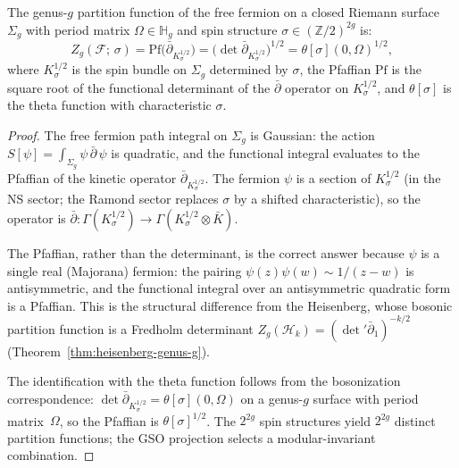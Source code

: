 \begin{theorem}
\label{thm:fermion-sewing}
The genus-$g$ partition function of the free fermion on a closed Riemann
surface $\Sigma_g$ with period matrix $\Omega \in \mathbb{H}_g$ and
spin structure $\sigma \in (\mathbb{Z}/2)^{2g}$ is:
\begin{equation}\label{eq:fermion-partition}
Z_g(\mathcal{F};\, \sigma)
= \mathrm{Pf}\bigl(\bar{\partial}_{K^{1/2}_\sigma}\bigr)
= \bigl(\det \bar{\partial}_{K^{1/2}_\sigma}\bigr)^{1/2}
= \theta[\sigma](0,\Omega)^{1/2},
\end{equation}
where $K^{1/2}_\sigma$ is the spin bundle on $\Sigma_g$ determined by
$\sigma$, the Pfaffian $\mathrm{Pf}$ is the square root of the functional
determinant of the $\bar\partial$ operator on $K^{1/2}_\sigma$, and
$\theta[\sigma]$ is the theta function with characteristic $\sigma$.
\end{theorem}

\begin{proof}
The free fermion path integral on $\Sigma_g$ is Gaussian:
the action $S[\psi] = \int_{\Sigma_g} \psi\, \bar{\partial}\, \psi$
is quadratic, and the functional integral evaluates to the Pfaffian
of the kinetic operator $\bar{\partial}_{K^{1/2}_\sigma}$. The fermion
$\psi$ is a section of $K^{1/2}_\sigma$ (in the NS sector;
the Ramond sector replaces $\sigma$ by a shifted characteristic),
so the operator is $\bar{\partial}: \Gamma(K^{1/2}_\sigma) \to
\Gamma(K^{1/2}_\sigma \otimes \bar{K})$.

The Pfaffian, rather than the determinant, is the correct answer because
$\psi$ is a single real (Majorana) fermion: the pairing
$\psi(z)\psi(w) \sim 1/(z-w)$ is antisymmetric, and the functional
integral over an antisymmetric quadratic form is a Pfaffian. This
is the structural difference from the Heisenberg, whose bosonic
partition function is a Fredholm determinant
$Z_g(\mathcal{H}_k) = (\det' \bar{\partial}_1)^{-k/2}$
\textup{(}Theorem~\ref{thm:heisenberg-genus-g}\textup{)}.

The identification with the theta function follows from the
bosonization correspondence: $\det \bar{\partial}_{K^{1/2}_\sigma}
= \theta[\sigma](0,\Omega)$ on a genus-$g$ surface with period
matrix~$\Omega$, so the Pfaffian is $\theta[\sigma]^{1/2}$.
The $2^{2g}$ spin structures yield $2^{2g}$ distinct partition
functions; the GSO projection selects a modular-invariant combination.
\end{proof}

